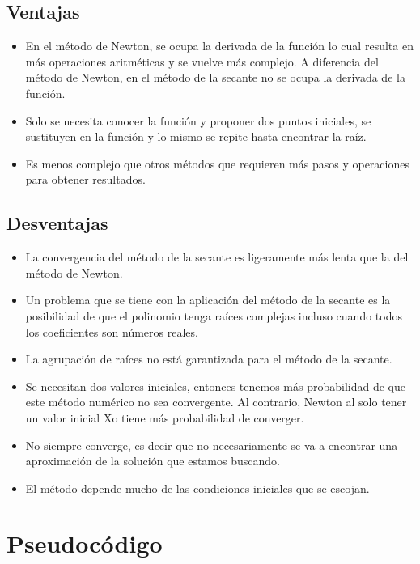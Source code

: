 \documentclass[10pt,technote]{IEEEtran}
\begin{document}
\subsection{Ventajas}

\begin{itemize}
  \item En el método de Newton, se ocupa la derivada de la función lo cual resulta en más operaciones aritméticas y se vuelve más complejo. A diferencia del método de Newton, en el método de la secante no se ocupa la derivada de la función.
  \item Solo se necesita conocer la función y proponer dos puntos iniciales, se sustituyen en la función y lo mismo se repite hasta encontrar la raíz.
  \item Es menos complejo que otros métodos que requieren más pasos y operaciones para obtener resultados.
\end{itemize}

\subsection{Desventajas}

\begin{itemize}
  \item La convergencia del método de la secante es ligeramente más lenta que la del método de Newton. 
  \item Un problema que se tiene con la aplicación del método de la secante es la posibilidad de que el polinomio tenga raíces complejas incluso cuando todos los coeficientes son números reales. 
  \item La agrupación de raíces no está garantizada para el método de la secante.
  \item Se necesitan dos valores iniciales, entonces tenemos más probabilidad de que este método numérico no sea convergente. Al contrario, Newton al solo tener un valor inicial Xo tiene más probabilidad de converger.
  \item No siempre converge, es decir que no necesariamente se va a encontrar una aproximación de la solución que estamos buscando.
  \item El método depende mucho de las condiciones iniciales que se escojan.
\end{itemize}

\section{Pseudocódigo}
\end{document}
